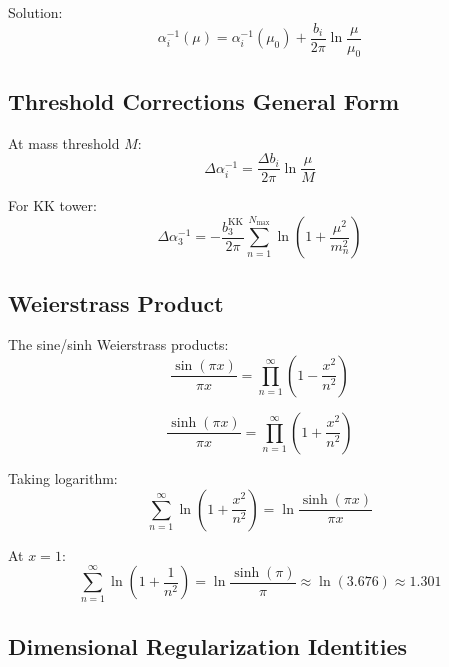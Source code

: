 \documentclass[11pt,a4paper]{article}
\theoremstyle{definition}
\begin{document}
Solution:
\begin{equation}
\label{eq:rg-solution}
\alpha_i^{-1}(\mu) = \alpha_i^{-1}(\mu_0) + \frac{b_i}{2\pi} \ln\frac{\mu}{\mu_0}
\end{equation}

\subsection{Threshold Corrections General Form}
\label{subsec:threshold-general}

At mass threshold $M$:
\begin{equation}
\label{eq:threshold-step}
\Delta\alpha_i^{-1} = \frac{\Delta b_i}{2\pi} \ln\frac{\mu}{M}
\end{equation}

For KK tower:
\begin{equation}
\label{eq:threshold-kk}
\Delta\alpha_3^{-1} = -\frac{b_3^{\text{KK}}}{2\pi} \sum_{n=1}^{N_{\text{max}}}
  \ln\left(1 + \frac{\mu^2}{m_n^2}\right)
\end{equation}

\subsection{Weierstrass Product}
\label{subsec:weierstrass}

The sine/sinh Weierstrass products:
\begin{equation}
\label{eq:sin-weierstrass}
\frac{\sin(\pi x)}{\pi x} = \prod_{n=1}^{\infty}\left(1 - \frac{x^2}{n^2}\right)
\end{equation}

\begin{equation}
\label{eq:sinh-weierstrass}
\frac{\sinh(\pi x)}{\pi x} = \prod_{n=1}^{\infty}\left(1 + \frac{x^2}{n^2}\right)
\end{equation}

Taking logarithm:
\begin{equation}
\label{eq:log-sinh}
\sum_{n=1}^{\infty} \ln\left(1 + \frac{x^2}{n^2}\right) = \ln\frac{\sinh(\pi x)}{\pi x}
\end{equation}

At $x = 1$:
\begin{equation}
\label{eq:log-sinh-1}
\sum_{n=1}^{\infty} \ln\left(1 + \frac{1}{n^2}\right) = \ln\frac{\sinh(\pi)}{\pi}
  \approx \ln(3.676) \approx 1.301
\end{equation}

\subsection{Dimensional Regularization Identities}
\label{subsec:dimreg}
\end{document}
